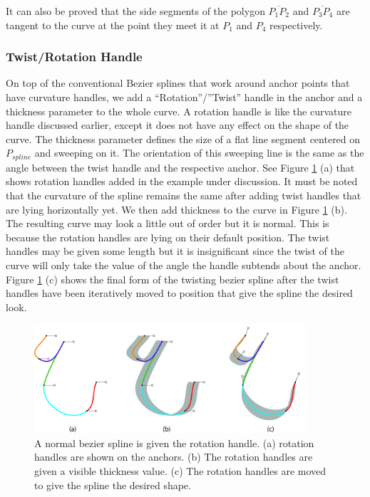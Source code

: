 It can also be proved that the side segments of the polygon $\overline{P_1 P_2}$ and $\overline{P_3 P_4}$ are tangent to the curve at the point they meet it at $P_1$ and $P_4$ respectively.


\subsubsection{Twist/Rotation Handle}
    On top of the conventional Bezier splines that work around anchor points that have curvature handles, we add a “Rotation”/”Twist” handle in the anchor and a thickness parameter to the whole curve. A rotation handle is like the curvature handle discussed earlier, except it does not have any effect on the shape of the curve. The thickness parameter defines the size of a flat line segment  centered on $P_{spline}$ and sweeping on it. The orientation of this sweeping line is the same as the angle between the twist handle and the respective anchor. See Figure \ref{Fig:RotatingBezierSplines} (a) that shows rotation handles added in the example under discussion. It must be noted that the curvature of the spline remains the same after adding twist handles that are lying horizontally yet. We then add thickness to the curve in Figure \ref{Fig:RotatingBezierSplines} (b). The resulting curve may look a little out of order but it is normal. This is because the rotation handles are lying on their default position. The twist handles may be given some length but it is insignificant since the twist of the curve will only take the value of the angle the handle subtends about the anchor. Figure \ref{Fig:RotatingBezierSplines} (c) shows the final form of the twisting bezier spline after the twist handles have been iteratively moved to position that give the spline the desired look.

        \begin{figure}
          \centering
          \includegraphics[width=0.9\textwidth]{../Images/AddingTwist_300PPI.jpg}
          \caption{A normal bezier spline is given the rotation handle. (a) rotation handles are shown on the anchors. (b) The rotation handles are given a visible thickness value. (c) The rotation handles are moved to give the spline the desired shape.
          } \label{Fig:RotatingBezierSplines}
        \end{figure}

